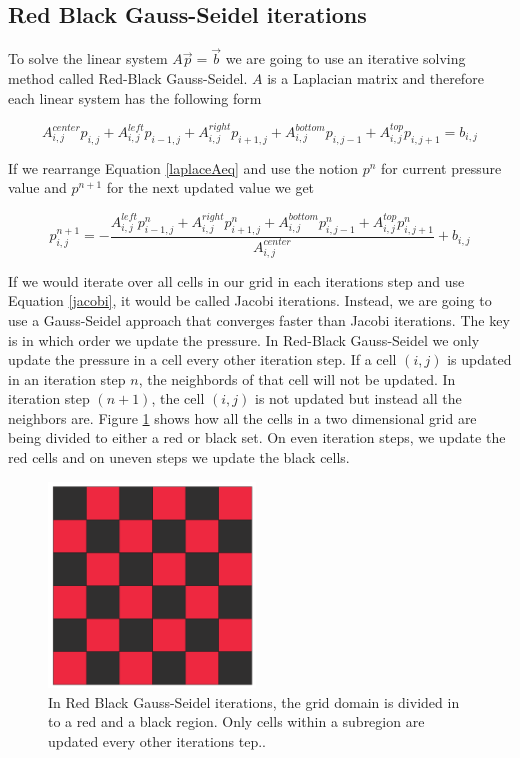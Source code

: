 \subsection{Red Black Gauss-Seidel iterations}

To solve the linear system $A\vec{p} = \vec{b}$ we are going to use an iterative solving method called Red-Black Gauss-Seidel. $A$ is a Laplacian matrix and therefore each linear system has the following form

\begin{equation}
{A}^{center}_{i,j} p_{i,j} + {A}^{left}_{i,j} p_{i-1,j} + {A}^{right}_{i,j} p_{i+1,j} + {A}^{bottom}_{i,j} p_{i,j-1} + {A}^{top}_{i,j} p_{i,j+1} = b_{i,j}
\label{laplaceAeq}
\end{equation}

If we rearrange Equation \ref{laplaceAeq} and use the notion $p^n$ for current pressure value and $p^{n+1}$ for the next updated value we get

\begin{equation}
{p}^{n+1}_{i,j}  = -\frac{ {A}^{left}_{i,j} {p}^{n}_{i-1,j} + {A}^{right}_{i,j} {p}^{n}_{i+1,j} + {A}^{bottom}_{i,j} {p}^{n}_{i,j-1} + {A}^{top}_{i,j} {p}^{n}_{i,j+1}}{{A}^{center}_{i,j}} + b_{i,j}
\label{jacobi}
\end{equation}

If we would iterate over all cells in our grid in each iterations step and use Equation \ref{jacobi}, it would be called Jacobi iterations. Instead, we are going to use a Gauss-Seidel approach that converges faster than Jacobi iterations. The key is in which order we update the pressure. In Red-Black Gauss-Seidel we only update the pressure in a cell every other iteration step. If a cell $(i,j)$ is updated in an iteration step $n$, the neighbords of that cell will not be updated. In iteration step $(n+1)$, the cell $(i,j)$ is not updated but instead all the neighbors are. Figure \ref{redblack} shows how all the cells in a two dimensional grid are being divided to either a red or black set. On even iteration steps, we update the red cells and on uneven steps we update the black cells.

\begin{figure}[ht!]
\centering
\includegraphics[width=55mm]{img/redblack.pdf}
\caption{In Red Black Gauss-Seidel iterations, the grid domain is divided in to a red and a black region. Only cells within a subregion are updated every other iterations tep..}
\label{redblack}
\end{figure}
